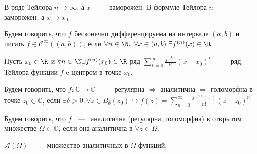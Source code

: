 \noindent В ряде Тейлора $n \rightarrow \infty$, а $x$ ~---~ заморожен. В формуле Тейлора $n$ ~---~ заморожен, а $x \rightarrow x_0$ 

\begin{definition}
    Будем говорить, что $f$ бесконечно дифференцируема на интервале $(a, b)$ и писать $f \in \mathcal{C}^{\infty}((a, b))$, если $\forall n \in \N, \ \forall x \in (a, b) \ \exists  f^{(n)}(x) \in \R$
\end{definition}

\begin{definition}
    Пусть $x_0 \in \R$ и $\forall n \in \N \exists f^{(n)}(x_0) \in \R$ ряд $\sum\limits_{k = 0}^\infty \frac{f^{(k)}}{k!}(x - x_0)^k$ ~---~ ряд Тейлора функции $f$ c центром в точке $x_0$.
\end{definition}

\begin{definition}
    Будем говорить, что $f : \mathbb{C} \rightarrow \mathbb{C}$ ~---~ регулярна $\Rightarrow$ аналитична $\Rightarrow$ голоморфна в точке $z_0 \in \mathbb{C}$, если $\exists \delta > 0 : \forall z \in B_{\delta}(z_0) \hookrightarrow f(z) = \sum\limits_{n = 0}^\infty \frac{f^{(n)}(z_0)}{n!}(z - z_0)^n$
\end{definition}

\begin{definition}
    Будем говорить, что $f$ ~---~ аналитична (регулярна, голоморфна) в открытом множестве $\Omega \subset \mathbb{C}$, если она аналитична в $\forall z \in \Omega$.
\end{definition}

\noindent $\mathcal{A}(\Omega)$ ~---~ множество аналитичных в $\Omega$ функций. 

